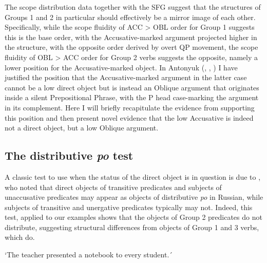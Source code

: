 \documentclass[output=paper,colorlinks,citecolor=brown,modfonts,nonflat]{langsci/langscibook}
\begin{document}
The scope distribution data together with the SFG suggest that the structures of Groups 1 and 2 in particular should effectively be a mirror image of each other. Specifically, while the scope fluidity of ACC > OBL order for Group 1 suggests this is the base order, with the Accusative-marked argument projected higher in the structure, with the opposite order derived by overt QP movement, the scope fluidity of OBL > ACC order for Group 2 verbs suggests the opposite, namely a lower position for the Accusative-marked object. In Antonyuk (\citeyear{Antonyuk2015}, \citeyear{Antonyuk2017}, \citeyear{Antonyuk2018}) I have justified the position that the Accusative-marked argument in the latter case cannot be a low direct object but is instead an Oblique argument that originates inside a silent Prepositional Phrase, with the P head case-marking the argument in its complement. Here I will briefly recapitulate the evidence from \citet{Antonyuk2015} supporting this position and then present novel evidence that the low Accusative is indeed not a direct object, but a low Oblique argument.

\subsection{The distributive \textit{po} test}\label{sec:antonyuk:3.1}

A classic test to use when the status of the direct object is in question is due to \citet{Pesetsky1982}, who noted that direct objects of transitive predicates and subjects of unaccusative predicates may appear as objects of distributive \textit{po} in Russian, while subjects of transitive and unergative predicates typically may not. Indeed, this test, applied to our examples shows that the objects of Group 2 predicates do not distribute, suggesting structural differences from objects of Group 1 and 3 verbs, which do.


    \glt    `The teacher presented a notebook to every student.´
    \z

\ea[*]{{%
    \label{ex:antonyuk:23}
    \gll    Maša ugosti-l-a po rebenk-u (kak-im-to pečen’je-m).\\
            Masha treat\textsc{-pst-f} \textsc{distr} child\textsc{-dat} \hspaceThis{[}some\textsc{-instr.m-ind} cookie\textsc{-instr.m}\\}\jambox*{Group 2}
    \glt    `Masha treated each child to a cookie.´}
    \z
\end{document}
